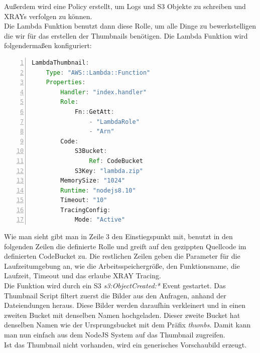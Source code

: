 \documentclass[a4paper, 12pt]{scrreprt}
\renewcommand\_{\textunderscore\allowbreak}
\begin{document}
Außerdem wird eine Policy erstellt, um Logs und S3 Objekte zu schreiben und XRAYs verfolgen zu können.\\
Die Lambda Funktion benutzt dann diese Rolle, um alle Dinge zu bewerkstelligen die wir für das erstellen der Thumbnails benötigen. Die Lambda Funktion wird folgendermaßen konfiguriert:
\bigskip
\begin{lstlisting}[xleftmargin=\parindent,numbers=left,numberstyle=\small,numbersep=8pt,frame=L,mathescape=true, basicstyle=\small, language=Java, lineskip={1.0pt}]
LambdaThumbnail:
    Type: "AWS::Lambda::Function"
    Properties: 
        Handler: "index.handler"
        Role: 
            Fn::GetAtt: 
                - "LambdaRole"
                - "Arn"
        Code:
            S3Bucket:
                Ref: CodeBucket
            S3Key: "lambda.zip"
        MemorySize: "1024"
        Runtime: "nodejs8.10"
        Timeout: "10"
        TracingConfig:
            Mode: "Active"
\end{lstlisting}
\bigskip
Wie man sieht gibt man in Zeile 3 den Einstiegspunkt mit, benutzt in den folgenden Zeilen die definierte Rolle und greift auf den gezippten Quellcode im definierten CodeBucket zu. Die restlichen Zeilen geben die Parameter für die Laufzeitumgebung an, wie die Arbeitsspeichergröße, den Funktionsname, die Laufzeit, Timeout und das erlaube XRAY Tracing.\\[0.5cm]
Die Funktion wird durch ein S3 \textit{s3:ObjectCreated:*} Event gestartet. Das Thumbnail Script filtert zuerst die Bilder aus den Anfragen, anhand der Dateiendungen heraus. Diese Bilder werden daraufhin verkleinert und in einen zweiten Bucket mit denselben Namen hochgeladen. Dieser zweite Bucket hat denselben Namen wie der Ursprungsbucket mit dem Präfix \textit{thumbs}. Damit kann man nun einfach aus dem NodeJS System auf das Thumbnail zugreifen. \\
Ist das Thumbnail nicht vorhanden, wird ein generisches Vorschaubild erzeugt. 
\end{document}
